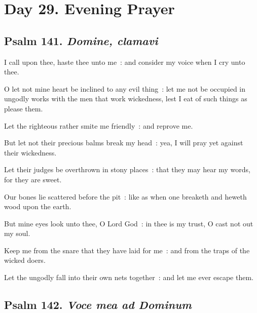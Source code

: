 \section*{Day 29. Evening Prayer}

\subsection{Psalm 141. \textit{Domine, clamavi}}

 I call upon thee, haste thee unto me~: and consider my voice when I cry unto thee.\par
{}
O let not mine heart be inclined to any evil thing~: let me not be occupied in ungodly works with the men that work wickedness, lest I eat of such things as please them.\par
{}Let the righteous rather smite me friendly~: and reprove me.\par
{}But let not their precious balms break my head~: yea, I will pray yet against their wickedness.\par
{}Let their judges be overthrown in stony places~: that they may hear my words, for they are sweet.\par
{}Our bones lie scattered before the pit~: like as when one breaketh and heweth wood upon the earth.\par
{}But mine eyes look unto thee, O Lord God~: in thee is my trust, O cast not out my soul.\par
{}Keep me from the snare that they have laid for me~: and from the traps of the wicked doers.\par
{}Let the ungodly fall into their own nets together~: and let me ever escape them.\par

\subsection{Psalm 142. \textit{Voce mea ad Dominum}}

